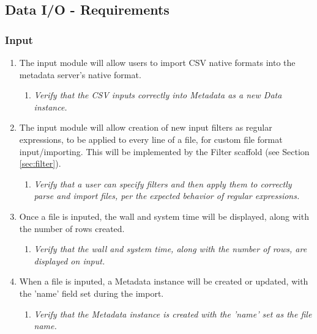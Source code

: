 \subsection{Data I/O - Requirements}
\label{sec:data_io_spec} 

\subsubsection{Input}
	\begin{enumerate}
		\item The input module will allow users to import CSV native 
			formats into the metadata server’s native format.
		\begin{enumerate}
			\item \textit{Verify that the CSV inputs correctly
					into Metadata as a new Data instance.}
		\end{enumerate}
		
		\item The input module will allow creation of new input filters
			as regular expressions, to be applied to every line
			of a file, for custom file format input/importing. This
			will be implemented by the Filter scaffold (see 
			Section \ref{sec:filter}).
		\begin{enumerate}
			\item \textit{Verify that a user can specify filters
				and then apply them to correctly parse and 
				import files, per the expected behavior
				of regular expressions.}
		\end{enumerate}

		\item Once a file is inputed, the wall and system time will be
			displayed, along with the number of rows created.
		\begin{enumerate}
			\item \textit{ Verify that the wall and system time, 
					along with the number of rows, are
					displayed on input.}
		\end{enumerate}

		\item When a file is inputed, a Metadata instance will be 
			created or updated, with the 'name' field set during 
			the import.
		\begin{enumerate}
			\item \textit{ Verify that the Metadata instance is
					created with the 'name' set as the
					file name. }
		\end{enumerate}


\end{enumerate}
